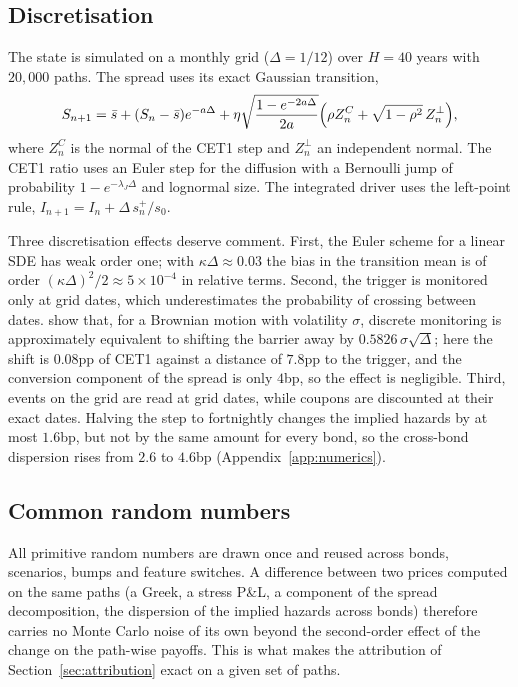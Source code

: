 \subsection{Discretisation}

The state is simulated on a monthly grid ($\Delta=1/12$) over $H=40$ years with
$20{,}000$ paths. The spread uses its exact Gaussian transition,
\begin{equation}
  S_{n+1}=\bar s+(S_n-\bar s)e^{-a\Delta}+\eta\sqrt{\frac{1-e^{-2a\Delta}}{2a}}
  \Bigl(\rho Z^C_n+\sqrt{1-\rho^2}\,Z^\perp_n\Bigr),
\end{equation}
where $Z^C_n$ is the normal of the CET1 step and $Z^\perp_n$ an independent normal. The
CET1 ratio uses an Euler step for the diffusion with a Bernoulli jump of probability
$1-e^{-\lambda_J\Delta}$ and lognormal size. The integrated driver uses the left-point rule,
$I_{n+1}=I_n+\Delta\,s^+_n/s_0$.

Three discretisation effects deserve comment. First, the Euler scheme for a linear SDE has
weak order one; with $\kappa\Delta\approx0.03$ the bias in the transition mean is of order
$(\kappa\Delta)^2/2\approx5\times10^{-4}$ in relative terms. Second, the trigger is
monitored only at grid dates, which underestimates the probability of crossing between
dates. \citet{BroadieGlassermanKou1997} show that, for a Brownian motion with volatility
$\sigma$, discrete monitoring is approximately equivalent to shifting the barrier away by
$0.5826\,\sigma\sqrt{\Delta}$; here the shift is $0.08$pp of CET1 against a distance of
$7.8$pp to the trigger, and the conversion component of the spread is only $4$bp, so the
effect is negligible. Third, events on the grid are read at grid dates, while coupons are
discounted at their exact dates. Halving the step to fortnightly changes the implied
hazards by at most $1.6$bp, but not by the same amount for every bond, so the cross-bond
dispersion rises from $2.6$ to $4.6$bp (Appendix~\ref{app:numerics}).

\subsection{Common random numbers}

All primitive random numbers are drawn once and reused across bonds, scenarios, bumps
and feature switches. A difference between two prices computed on the same paths
(a Greek, a stress P\&L, a component of the spread decomposition, the dispersion of the
implied hazards across bonds) therefore carries no Monte Carlo noise of its own beyond
the second-order effect of the change on the path-wise payoffs. This is what makes the
attribution of Section~\ref{sec:attribution} exact on a given set of paths.